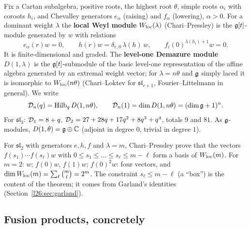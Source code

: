 Fix a Cartan subalgebra, positive roots, the highest root $\theta$, simple roots $\alpha_i$ with coroots $h_i$, and
Chevalley generators $e_\alpha$ (raising) and $f_\alpha$ (lowering), $\alpha>0$. For a dominant weight $\lambda$ the
\textbf{local Weyl module} $W_{\mathrm{loc}}(\lambda)$ (Chari--Pressley) is the $\mathfrak g[t]$-module generated by $w$ with
relations
\begin{equation}\label{l26:eq:weyl}
e_\alpha(r)w=0,\qquad h(r)w=\delta_{r,0}\,\lambda(h)\,w,\qquad f_i(0)^{\lambda(h_i)+1}w=0 .
\end{equation}
It is finite-dimensional and graded. The \textbf{level-one Demazure module} $D(1,\lambda)$ is the $\mathfrak g[t]$-submodule
of the basic level-one representation of the affine algebra generated by an extremal weight vector; for $\lambda=n\theta$ and
$\mathfrak g$ simply laced it is isomorphic to $W_{\mathrm{loc}}(n\theta)$ (Chari--Loktev for $\mathfrak{sl}_{r+1}$,
Fourier--Littelmann in general). We write
\begin{equation*}
\mathcal D_n(q)=\operatorname{Hilb}_q D(1,n\theta),\qquad \mathcal D_n(1)=\dim D(1,n\theta)=(\dim\mathfrak g+1)^n .
\end{equation*}
For $\mathfrak{sl}_3$: $\mathcal D_1=8+q$, $\mathcal D_2=27+28q+17q^2+8q^3+q^4$, totals $9$ and $81$. As
$\mathfrak g$-modules, $D(1,\theta)=\mathfrak g\oplus{\mathbb{C}}$ (adjoint in degree $0$, trivial in degree $1$).

\begin{example}\label{l26:ex:sl2}
For $\mathfrak{sl}_2$ with generators $e,h,f$ and $\lambda=m$, Chari--Pressley prove that the vectors
$f(s_1)\cdots f(s_\ell)w$ with $0\le s_1\le\dots\le s_\ell\le m-\ell$ form a basis of $W_{\mathrm{loc}}(m)$. For $m=2$:
$w$; $f(0)w$, $f(1)w$; $f(0)^2w$: four vectors, and $\dim W_{\mathrm{loc}}(m)=\sum_\ell\binom m\ell=2^m$. The constraint
$s_\ell\le m-\ell$ (a ``box'') is the content of the theorem; it comes from Garland's identities
(Section~\ref{l26:sec:garland}).
\end{example}

\subsection{Fusion products, concretely}\label{l26:sec:fusion}

